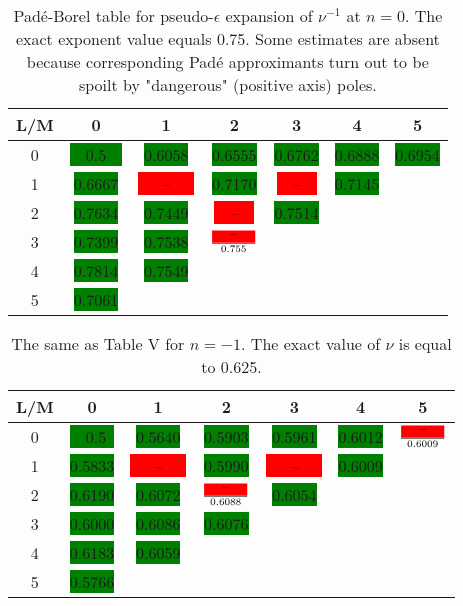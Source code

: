 \documentclass[preprint,preprintnumbers,amsmath,amssymb]{revtex4}
\newcommand{\red}[1]{\colorbox{red}{#1}}    %
\newcommand{\green}[1]{\colorbox{green}{#1}}%
\begin{document}
\begin{table}[t]
\caption{Pad\'e-Borel table for pseudo-$\epsilon$ expansion of $\nu^{-1}$ at $n = 0$.
The exact exponent value equals 0.75. Some estimates are absent because corresponding
Pad\'e approximants turn out to be spoilt by "dangerous" (positive axis) poles.}
\label{tab5}
\renewcommand{\tabcolsep}{0.4cm}
\begin{tabular}{|*{7}{c|}}\hline
L/M& 0& 1 & 2 & 3 & 4 & 5\\ \hline
0 & \green{~~0.5~~}&\green{ 0.6058} & \green{0.6555} & \green{0.6762} & \green{0.6888} & \green{0.6954} \\ \hline
1 & \green{0.6667} & \red{~~~--~~~} & \green{0.7170} & \red{~~--~~} & \green{0.7145} & \\ \hline
2 & \green{0.7634} &\green{ 0.7449} & \red{~~--~~} & \green{0.7514}& & \\ \hline
3 & \green{0.7399} &\green{ 0.7538} & $\frac{\red{~~~--~~~}}{0.755}$ & & & \\ \hline
4 & \green{0.7814} &\green{ 0.7549} & & & & \\ \hline
5 & \green{0.7061} & & & & & \\ \hline
\end{tabular}
\end{table}

\begin{table}[t]
\caption{The same as Table V for $n = -1$. The exact value of $\nu$ is equal to 0.625.}
\label{tab6}
\renewcommand{\tabcolsep}{0.4cm}
\begin{tabular}{|*{7}{c|}}\hline
L/M & 0 & 1 & 2 & 3 & 4 & 5\\ \hline
0 & \green{~~0.5~} & \green{0.5640} & \green{0.5903} & \green{0.5961} & \green{0.6012} & $\frac{\red{~~~--~~~}}{0.6009}$ \\ \hline
1 & \green{0.5833} & \red{~~~--~~~} & \green{0.5990} & \red{~~~--~~~} & \green{0.6009} & \\ \hline
2 & \green{0.6190} & \green{0.6072} & $\frac{\red{~~~--~~~}}{0.6088}$ & \green{0.6054} & & \\ \hline
3 & \green{0.6000} & \green{0.6086} & \green{0.6076} & & & \\ \hline
4 & \green{0.6183} & \green{0.6059} & & & & \\ \hline
5 & \green{0.5766} & & & & & \\ \hline
\end{tabular}
\end{table}
\end{document}
